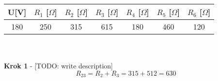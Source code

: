 \documentclass{article}
\begin{document}
\begin{tabular}{| c | c | c | c | c | c | c |}
  \hline
   U[V] & $R_{1}$ [$\Omega$] & $R_{2}$ [$\Omega$]& $R_{3}$ [$\Omega$]& $R_{4}$ [$\Omega$]& $R_{5}$ [$\Omega$]& $R_{6}$ [$\Omega$]\\
  \hline
  180 & 250 & 315 & 615 & 180 & 460 & 120\\
  \hline
\end{tabular}\\
\\
\textbf{Krok 1} - [TODO: write description]\\
\[
  R_{23} = R_{2} + R_{3} = 315 + 512 = 630
\]
\end{document}
